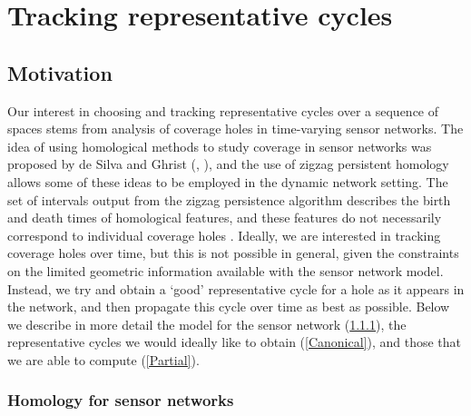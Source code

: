 \documentclass[12pt]{article}
\begin{document}
\section{Tracking representative cycles}\label{RepCycles}

\subsection{Motivation}
Our interest in choosing and tracking representative cycles over a sequence of spaces stems from analysis of coverage holes in time-varying sensor networks. The idea of using homological methods to study coverage in sensor networks was proposed by de Silva and Ghrist (\cite{deSilva2006}, \cite{deSilva2007}), and the use of zigzag persistent homology allows some of these ideas to be employed in the dynamic network setting. The set of intervals output from the zigzag persistence algorithm describes the birth and death times of homological features, and these features do not necessarily correspond to individual coverage holes \cite{Adams2013}. Ideally, we are interested in tracking coverage holes over time, but this is not possible in general, given the constraints on the limited geometric information available with the sensor network model. Instead, we try and obtain a `good' representative cycle for a hole as it appears in the network, and then propagate this cycle over time as best as possible. Below we describe in more detail the model for the sensor network (\ref{Networks}), the representative cycles we would ideally like to obtain (\ref{Canonical}), and those that we are able to compute (\ref{Partial}).

\subsubsection{Homology for sensor networks}\label{Networks}
\end{document}
